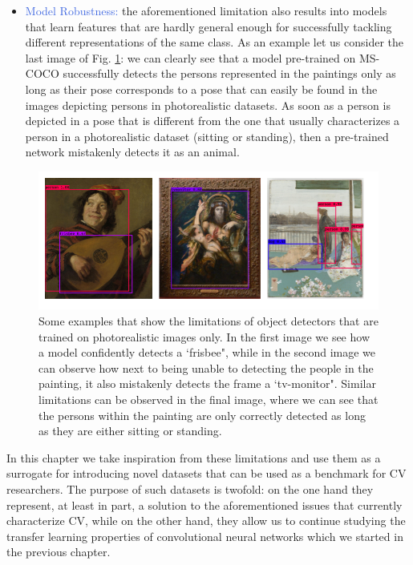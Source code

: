 \begin{itemize}
	\item \textcolor{RoyalBlue}{Model Robustness:} the aforementioned limitation also results into models that learn features that are hardly general enough for successfully tackling different representations of the same class. As an example let us consider the last image of Fig. \ref{fig:fails}: we can clearly see that a model pre-trained on MS-COCO successfully detects the persons represented in the paintings only as long as their pose corresponds to a pose that can easily be found in the images depicting persons in photorealistic datasets. As soon as a person is depicted in a pose that is different from the one that usually characterizes a person in a photorealistic dataset (sitting or standing), then a pre-trained network mistakenly detects it as an animal.   
\end{itemize}

\begin{figure}[ht!]
\centering
  \includegraphics[width=\linewidth]{./Images/Chapter05/fails}
  \caption{Some examples that show the limitations of object detectors that are trained on photorealistic images only. In the first image we see how a model confidently detects a `frisbee", while in the second image we can observe how next to being unable to detecting the people in the painting, it also mistakenly detects the frame a `tv-monitor". Similar limitations can be observed in the final image, where we can see that the persons within the painting are only correctly detected as long as they are either sitting or standing.}
  \label{fig:fails}
\end{figure}

In this chapter we take inspiration from these limitations and use them as a surrogate for introducing novel datasets that can be used as a benchmark for CV researchers. The purpose of such datasets is twofold: on the one hand they represent, at least in part, a solution to the aforementioned issues that currently characterize CV, while on the other hand, they allow us to continue studying the transfer learning properties of convolutional neural networks which we started in the previous chapter.  

